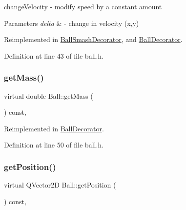 change\+Velocity -\/ modify speed by a constant amount 


\begin{DoxyParams}{Parameters}
{\em delta} & -\/ change in velocity (x,y) \\
\hline
\end{DoxyParams}


Reimplemented in \mbox{\hyperlink{class_ball_smash_decorator_ad59848156e8eabad3e561a1d113f7029}{Ball\+Smash\+Decorator}}, and \mbox{\hyperlink{class_ball_decorator_a3e4f4d31f6409f018b8b337bcf2bd284}{Ball\+Decorator}}.



Definition at line 43 of file ball.\+h.

\mbox{\label{class_ball_a4b8e6ae922e7c1bfe6ab4568a591580e}} 
\subsubsection{\texorpdfstring{get\+Mass()}{getMass()}}
{\footnotesize\ttfamily virtual double Ball\+::get\+Mass (\begin{DoxyParamCaption}{ }\end{DoxyParamCaption}) const\hspace{0.3cm}{\ttfamily [inline]}, {\ttfamily [virtual]}}



Reimplemented in \mbox{\hyperlink{class_ball_decorator_acf6892e513f9dc01bb6f87028e8ca9d5}{Ball\+Decorator}}.



Definition at line 50 of file ball.\+h.

\mbox{\label{class_ball_a8861d6e0221d1b4d8468458fc2ec9b3c}} 
\subsubsection{\texorpdfstring{get\+Position()}{getPosition()}}
{\footnotesize\ttfamily virtual Q\+Vector2D Ball\+::get\+Position (\begin{DoxyParamCaption}{ }\end{DoxyParamCaption}) const\hspace{0.3cm}{\ttfamily [inline]}, {\ttfamily [virtual]}}



